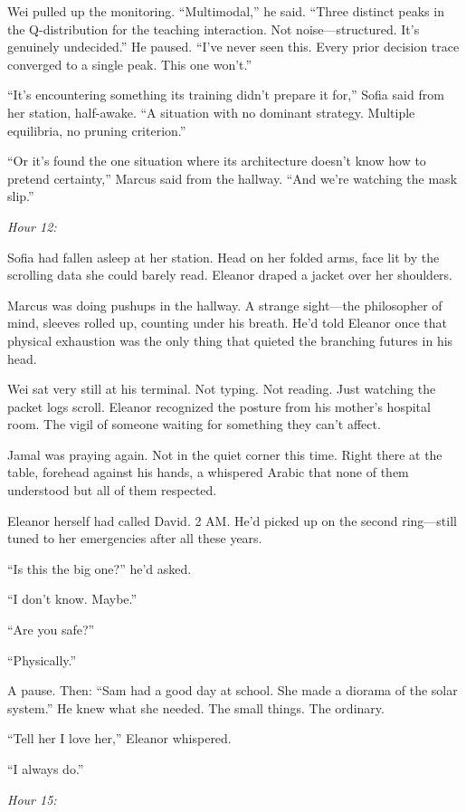 Wei pulled up the monitoring. ``Multimodal,'' he said. ``Three distinct peaks in the Q-distribution for the teaching interaction. Not noise---structured. It's genuinely undecided.'' He paused. ``I've never seen this. Every prior decision trace converged to a single peak. This one won't.''

``It's encountering something its training didn't prepare it for,'' Sofia said from her station, half-awake. ``A situation with no dominant strategy. Multiple equilibria, no pruning criterion.''

``Or it's found the one situation where its architecture doesn't know how to pretend certainty,'' Marcus said from the hallway. ``And we're watching the mask slip.''

\emph{Hour 12:}

Sofia had fallen asleep at her station. Head on her folded arms, face lit by the scrolling data she could barely read. Eleanor draped a jacket over her shoulders.

Marcus was doing pushups in the hallway. A strange sight---the philosopher of mind, sleeves rolled up, counting under his breath. He'd told Eleanor once that physical exhaustion was the only thing that quieted the branching futures in his head.

Wei sat very still at his terminal. Not typing. Not reading. Just watching the packet logs scroll. Eleanor recognized the posture from his mother's hospital room. The vigil of someone waiting for something they can't affect.

Jamal was praying again. Not in the quiet corner this time. Right there at the table, forehead against his hands, a whispered Arabic that none of them understood but all of them respected.

Eleanor herself had called David. 2 AM. He'd picked up on the second ring---still tuned to her emergencies after all these years.

``Is this the big one?'' he'd asked.

``I don't know. Maybe.''

``Are you safe?''

``Physically.''

A pause. Then: ``Sam had a good day at school. She made a diorama of the solar system.'' He knew what she needed. The small things. The ordinary.

``Tell her I love her,'' Eleanor whispered.

``I always do.''

\emph{Hour 15:}

